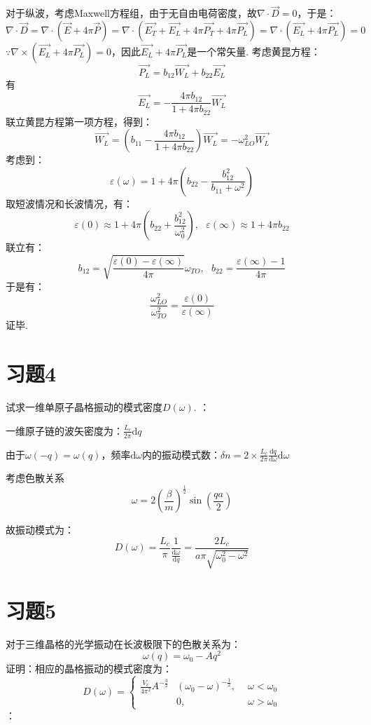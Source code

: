 \documentclass[UTF8]{ctexart}
\newcommand{\dd}{\mathrm{d}}
\newcommand{\ora}{\overrightarrow}
\begin{document}
对于纵波，考虑Maxwell方程组，由于无自由电荷密度，故$\nabla\cdot\ora{D}=0$，于是：
$$\nabla\cdot\ora{D}=\nabla\cdot(\ora{E}+4\pi\ora{P})=\nabla\cdot(\ora{E_T}+\ora{E_L}+4\pi\ora{P_T}+4\pi\ora{P_L})=\nabla\cdot(\ora{E_L}+4\pi\ora{P_L})=0$$
$\because\nabla\times(\ora{E_L}+4\pi\ora{P_L})=0$，因此$\ora{E_L}+4\pi\ora{P_L}$是一个常矢量.
考虑黄昆方程：
$$\ora{P_L}=b_{12}\ora{W_L}+b_{22}\ora{E_L}$$
有
$$\ora{E_L}=-\frac{4\pi b_{12}}{1+4\pi b_{22}}\ora{W_L}$$
联立黄昆方程第一项方程，得到：
$$\ddot{\ora{W_L}}=(b_{11}-\frac{4\pi b_{12}}{1+4\pi b_{22}})\ora{W_L}=-\omega_{LO}^2\ora{W_L}$$
考虑到：
$$\varepsilon(\omega)=1+4\pi(b_{22}-\frac{b_{12}^2}{b_{11}+\omega^2})$$
取短波情况和长波情况，有：
$$\varepsilon(0)\approx 1+4\pi(b_{22}+\frac{b_{12}^2}{\omega_0^2}),\ \ \ \varepsilon(\infty)\approx 1+4\pi b_{22}$$
联立有：
$$b_{12}=\sqrt{\frac{\varepsilon(0)-\varepsilon(\infty)}{4\pi}}\omega_{TO},\ \ \ b_{22}=\frac{\varepsilon(\infty)-1}{4\pi}$$
于是有：
$$\frac{\omega_{LO}^2}{\omega_{TO}^2}=\frac{\varepsilon(0)}{\varepsilon(\infty)}$$
证毕.
\vskip 0.5cm
\section*{习题4}
试求一维单原子晶格振动的模式密度$D(\omega)$.
\vskip 0.3cm
：

一维原子链的波矢密度为：$\frac{L_c}{2\pi}\dd q$

由于$\omega(-q)=\omega(q)$，频率$\dd\omega$内的振动模式数：$\delta n=2\times\frac{L_c}{2\pi}\frac{\dd q}{\dd\omega}\dd\omega$

考虑色散关系
$$\omega=2\left(\frac{\beta}{m}\right)^{\frac{1}{2}}\sin{\left(\frac{qa}{2}\right)}$$

故振动模式为：
$$D(\omega)=\frac{L_c}{\pi}\frac{1}{\frac{\dd\omega}{\dd q}}=\frac{2L_c}{a\pi\sqrt{\omega_0^2-\omega^2}}$$

\vskip 0.5cm
\section*{习题5}
对于三维晶格的光学振动在长波极限下的色散关系为：$$\omega(q)=\omega_0-Aq^2$$证明：相应的晶格振动的模式密度为：
\begin{equation*}
    D(\omega)=\left\{\begin{aligned}
        \frac{V_c}{4\pi^2}A^{-\frac{3}{2}}&(\omega_0-\omega)^{-\frac{1}{2}},\ \ &\omega<\omega_0\\
        &0,&\omega>\omega_0
    \end{aligned}\right.
\end{equation*}
\vskip 0.3cm
：
\end{document}
